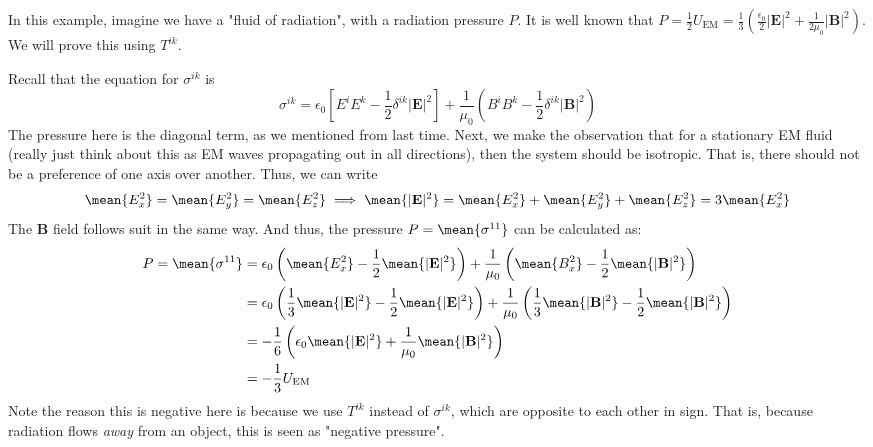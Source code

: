 \begin{example}
	In this example, imagine we have a "fluid of radiation", with a radiation pressure \( P \). It is well
	known that \( P = \frac{1}{2}U_\text{EM} = \frac{1}{3}\left( \frac{\epsilon_0}{2}|\mathbf{E}|^2 +
	\frac{1}{2\mu_0}|\mathbf{B}|^2 \right) \). We will prove this using \( T^{ik} \).   

	\begin{solution}
		Recall that the equation for \( \sigma^{ik} \) is
		\[
			\sigma^{ik} = \epsilon_0 \left[ E^{i}E^{k} - \frac{1}{2}\delta^{ik} |\mathbf{E}|^2 \right] +
			\frac{1}{\mu_0}\left( B^{i}B^{k} - \frac{1}{2}\delta^{ik}|\mathbf{B}|^2 \right)
		\]
		The pressure here is the diagonal term, as we mentioned from last time. Next, we make the observation
		that for a stationary EM fluid (really just think about this as EM waves propagating out in all
		directions), then the system should be isotropic. That is, there should not be a preference of one
		axis over another. Thus, we can write
		\[
			\mean{E_x^2} = \mean{E_y^2} = \mean{E_z^2} \implies \mean{|\mathbf{E}|^2} = \mean{E_x^2} +
			\mean{E_y^2} + \mean{E_z^2} = 3\mean{E_x^2}
		\]
		The \( \mathbf{B} \) field follows suit in the same way. 
		And thus, the pressure \( P = \mean{\sigma^{11}} \) can be calculated as:
		\begin{align*}
			P = \mean{\sigma^{11}} &= \epsilon_0 \left( \mean{E_x^2} - \frac{1}{2}\mean{|\mathbf{E}|^2}
			\right) + \frac{1}{\mu_0}\left( \mean{B_x^2} - \frac{1}{2} \mean{|\mathbf{B}|^2}\right) \\
								   &= \epsilon_0 \left( \frac{1}{3}\mean{|\mathbf{E}|^2} -
								   \frac{1}{2}\mean{|\mathbf{E}|^2} \right) + 
								   \frac{1}{\mu_0} \left( \frac{1}{3}\mean{|\mathbf{B}|^2} -
								   \frac{1}{2}\mean{|\mathbf{B}|^2} \right)\\
								   &= -\frac{1}{6}\left( \epsilon_0 \mean{|\mathbf{E}|^2} +
								   \frac{1}{\mu_0}\mean{|\mathbf{B}|^2} \right) \\ 
								   &= -\frac{1}{3}U_\text{EM} 
		\end{align*}
		Note the reason this is negative here is because we use \( T^{ik} \) instead of \( \sigma^{ik} \),
		which are opposite to each other in sign. That is, because radiation flows \textit{away} from an
		object, this is seen as "negative pressure".  
	\end{solution}
\end{example}

